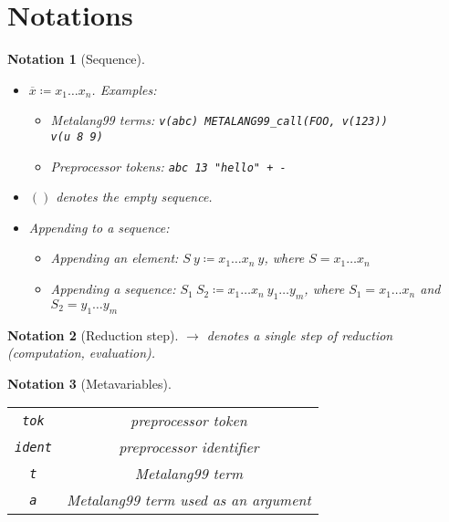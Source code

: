 \documentclass[12pt]{article}
\theoremstyle{break}
\newtheorem{notation}{Notation}
\begin{document}
\section{Notations}

\begin{notation}[Sequence]
    \begin{itemize}
        \item $\overline{x} \coloneqq x_1 \ldots x_n$. Examples:
        \begin{itemize}
            \item Metalang99 terms: \texttt{v(abc) METALANG99\_call(FOO, v(123)) \\ v(u 8 9)}
            \item Preprocessor tokens: \texttt{abc 13 "hello" + -}
        \end{itemize}
        \item $()$ denotes the empty sequence.
        \item Appending to a sequence:
        \begin{itemize}
            \item Appending an element: $S \ y \coloneqq x_1 \ldots x_n \ y$, where $S = x_1 \ldots x_n$
            \item Appending a sequence: $S_1 \ S_2 \coloneqq x_1 \ldots x_n \ y_1 \ldots y_m$, where $S_1 = x_1 \ldots x_n$
            and $S_2 = y_1 \ldots y_m$
        \end{itemize}
    \end{itemize}
\end{notation}

\begin{notation}[Reduction step]
    $\to$ denotes a single step of reduction (computation, evaluation).
\end{notation}

\begin{notation}[Metavariables]
    \ \\
    \begin{tabular}{|c|c|}
        \hline
        \texttt{tok} & preprocessor token \\
        \texttt{ident} & preprocessor identifier \\
        \texttt{t} & Metalang99 term \\
        \texttt{a} & Metalang99 term used as an argument \\
        \hline
    \end{tabular}
\end{notation}
\end{document}
